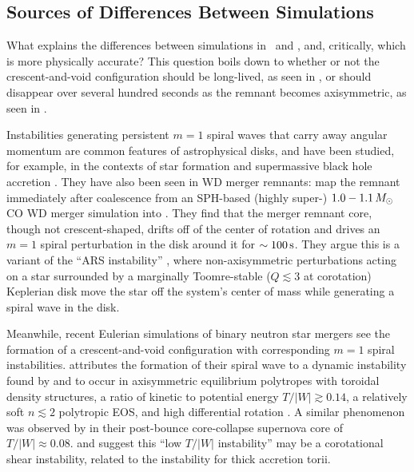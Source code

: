 
\subsection{Sources of Differences Between Simulations}
\label{ssec:c3_differences_merger_process}

What explains the differences between simulations in \gasoline\ and \arepo, and, critically, which is more physically accurate?  This question boils down to whether or not the crescent-and-void configuration should be long-lived, as seen in \arepo, or should disappear over several hundred seconds as the remnant becomes axisymmetric, as seen in \gasoline.


Instabilities generating persistent $m = 1$ spiral waves that carry away angular momentum are common features of astrophysical disks, and have been studied, for example, in the contexts of star formation \citep{adamrs89, shu+90, lin15, kratl16} and supermassive black hole accretion \citep{hopkq10}.  They have also been seen in WD merger remnants: \cite{kash+15} map the remnant immediately after coalescence from an SPH-based (highly super-\Mch) $1.0-1.1\,\Msun$ CO WD merger simulation into \flash.  They find that the merger remnant core, though not crescent-shaped, drifts off of the center of rotation and drives an $m = 1$ spiral perturbation in the disk around it for $\sim100\,\mathrm{s}$.  They argue this is a variant of the ``ARS instability'' \citep{adamrs89, shu+90}, where non-axisymmetric perturbations acting on a star surrounded by a marginally Toomre-stable ($Q \lesssim 3$ at corotation) Keplerian disk move the star off the system's center of mass while generating a spiral wave in the disk.

Meanwhile, recent Eulerian simulations of binary neutron star mergers \citep{pasc+15, radibo16} see the formation of a crescent-and-void configuration with corresponding $m = 1$ spiral instabilities.  \cite{pasc+15} attributes the formation of their spiral wave to a dynamic instability found by \cite{cent+01} and \cite{saijbs03} to occur in axisymmetric equilibrium polytropes with toroidal density structures, a ratio of kinetic to potential energy $T/|W| \gtrsim 0.14$, a relatively soft $n \lesssim 2$ polytropic EOS, and high differential rotation \citep{saijbs03}.  A similar phenomenon was observed by \cite{ott+05} in their post-bounce core-collapse supernova core of $T/|W| \approx 0.08$.  \cite{wattaj05} and \cite{muhl+14} suggest this ``low $T/|W|$ instability'' may be a corotational shear instability, related to the \cite{papap84} instability for thick accretion torii.

